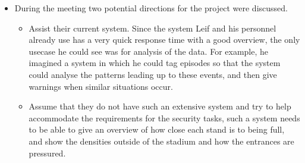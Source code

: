 \begin{itemize}
    \item During the meeting two potential directions for the project were discussed.
    \begin{itemize}
        \item Assist their current system. Since the system Leif and his personnel already use has a very quick response time with a good overview, the only usecase he could see was for analysis of the data. For example, he imagined a system in which he could tag episodes so that the system could analyse the patterns leading up to these events, and then give warnings when similar situations occur.
        \item Assume that they do not have such an extensive system and try to help accommodate the requirements for the security tasks, such a system needs to be able to give an overview of how close each stand is to being full, and show the densities outside of the stadium and how the entrances are pressured.
    \end{itemize}
\end{itemize}
